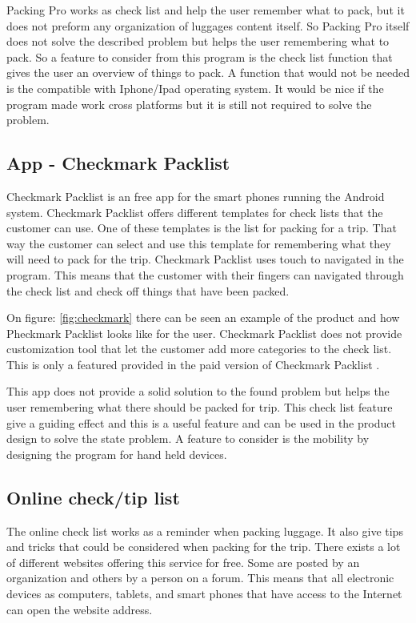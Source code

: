 Packing Pro works as check list and help the user remember what to pack, but it does not preform any organization of luggages content itself. So Packing Pro itself does not solve the described problem but helps the user remembering what to pack. So a feature to consider from this program is the check list function that gives the user an overview of things to pack.
A function that would not be needed is the compatible with Iphone/Ipad operating system. It would be nice if the program made work cross platforms but it is still not required to solve the problem.

\subsection{App - Checkmark Packlist}

Checkmark Packlist is an free app for the smart phones running the Android system.
Checkmark Packlist offers different templates for check lists that the customer can use. One of these templates is the list for packing for a trip. That way the customer can select and use this template for remembering what they will need to pack for the trip. Checkmark Packlist uses touch to navigated in the program. This means that the customer with their fingers can navigated through the check list and check off things that have been packed.


On figure: \ref{fig:checkmark} there can be seen an example of the product and how Pheckmark Packlist looks like for the user.
Checkmark Packlist does not provide customization tool that let the customer add more categories to the check list. This is only a featured provided in the paid version of Checkmark Packlist \citep{checkpacklist}.

This app does not provide a solid solution to the found problem but helps the user remembering what there should be packed for trip. This check list feature give a guiding effect and this is a useful feature and can be used in the product design to solve the state problem. A feature to consider is the mobility by designing the program for hand held devices.

\subsection{Online check/tip list}

The online check list works as a reminder when packing luggage. It also give tips and tricks that could be considered when packing for the trip. There exists a lot of different websites offering this service for free. Some are posted by an organization and others by a person on a forum. This means that all electronic devices as computers, tablets, and smart phones that have access to the Internet can open the website address.

